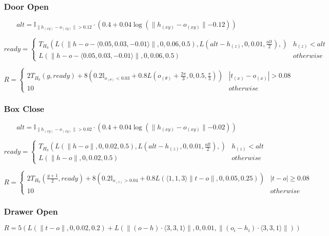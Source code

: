{\subsubsection{Door Open}
\[
alt = \mathbb{I}_{\lVert h_{(xy)} - o_{(xy)} \lVert > 0.12} \cdot \left(0.4 + 0.04\log\left(\lVert h_{(xy)} - o_{(xy)} \lVert-0.12\right) \right)
\]

\[ready=\left\{
\begin{array}{ll}
T_{H_0}\left(
    L(\lVert h-o-\langle0.05,0.03,-0.01\rangle \rVert, 0, 0.06, 0.5), 
    L(alt-h_{(z)}, 0, 0.01, \frac{alt}{2}),
\right)
& h_{(z)} < alt \\

L(\lVert h-o-\langle0.05,0.03,-0.01\rangle \rVert, 0, 0.06, 0.5)
& otherwise
\end{array} \right. \]

\[R=\left\{
\begin{array}{ll}
2T_{H_0}\left(g, ready\right) +
8\left( 0.2\mathbb{I}_{o_{(\theta)} < 0.03} + 0.8L(o_{(\theta)} + \frac{2\pi}{3}, 0, 0.5, \frac{\pi}{3}) \right)
& |t_{(x)} - o_{(x)}| > 0.08 \\

10 & otherwise
\end{array} \right. \]

\subsubsection{Box Close}
\[
alt = \mathbb{I}_{\lVert h_{(xy)} - o_{(xy)} \lVert > 0.02} \cdot \left(0.4 + 0.04\log\left(\lVert h_{(xy)} - o_{(xy)} \lVert-0.02\right) \right)
\]

\[ready=\left\{
\begin{array}{ll}
T_{H_0}\left(
    L(\lVert h-o \rVert, 0, 0.02, 0.5), 
    L(alt-h_{(z)}, 0, 0.01, \frac{alt}{2}),
\right)
& h_{(z)} < alt \\

L(\lVert h-o \rVert, 0, 0.02, 0.5)
& otherwise
\end{array} \right. \]

\[R=\left\{
\begin{array}{ll}
2T_{H_0}\left(\frac{g+1}{2}, ready\right) +
8\left( 0.2\mathbb{I}_{o_{(z)} > 0.04} + 0.8L(\langle 1, 1, 3 \rangle \lVert t - o \rVert, 0, 0.05, 0.25) \right)
& |t - o| \geq 0.08 \\

10 & otherwise
\end{array} \right. \]

\subsubsection{Drawer Open}
\[
R=5\left(
    L\left(\lVert t - o \rVert, 0, 0.02, 0.2\right) +
    L\left(\lVert (o - h) \cdot \langle3, 3, 1\rangle \rVert, 0, 0.01, \lVert (o_i - h_i) \cdot \langle3, 3, 1\rangle \rVert \right)
    \right)
\]

}
